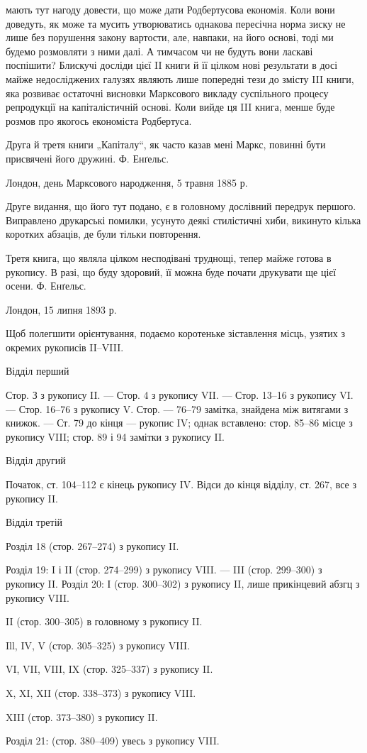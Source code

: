 \parcont{}  %
мають тут нагоду довести, що може дати Родбертусова економія. Коли
вони доведуть, як може та мусить утворюватись однакова пересічна
норма зиску не лише без порушення закону вартости, але, навпаки, на
його основі, тоді ми будемо розмовляти з ними далі. А тимчасом чи не
будуть вони ласкаві поспішити? Блискучі досліди цієї II книги й її цілком нові результати в досі
майже недосліджених галузях являють лише
попередні тези до змісту III книги, яка розвиває остаточні висновки Марксового
викладу суспільного процесу репродукції на капіталістичній
основі. Коли вийде ця III книга, менше буде розмов про якогось економіста
Родбертуса.

Друга й третя книги „Капіталу“, як часто казав мені Маркс, повинні
бути присвячені його дружині.
Ф. Енґельс.

Лондон, день Марксового народження, 5 травня 1885 р.

Друге видання, що його тут подано, є в головному дослівний передрук
першого. Виправлено друкарські помилки, усунуто деякі стилістичні
хиби, викинуто кілька коротких абзаців, де були тільки повторення.

Третя книга, що являла цілком несподівані труднощі, тепер майже
готова в рукопису. В разі, що буду здоровий, її можна буде почати
друкувати ще цієї осени. Ф. Енґельс.

Лондон, 15 липня 1893 р.

Щоб полегшити орієнтування, подаємо коротеньке зіставлення місць,
узятих з окремих рукописів II--VIII.

Відділ перший

Стор. З з рукопису II. — Стор. 4 з рукопису VII. — Стор. 13--16
з рукопису VI. — Стор. 16--76 з рукопису V. Стор. — 76--79 замітка, знайдена
між витягами з книжок. — Ст. 79 до кінця — рукопис IV; однак
вставлено: стор. 85--86 місце з рукопису VIII; стор. 89 і 94 замітки з
рукопису II.

Відділ другий

Початок, ст. 104--112 є кінець рукопису IV. Відси до кінця відділу,
ст. 267, все з рукопису II.

Відділ третій

Розділ 18 (стор. 267--274) з рукопису II.

Розділ 19: I і II (стор. 274--299) з рукопису VIII. — III (стор. 299--300)
з рукопису II.
Розділ 20: І (стор. 300--302) з рукопису II, лише прикінцевий
абзгц з рукопису VIII.

II (стор. 300--305) в головному з рукопису II.

Ill, IV, V (стор. 305--325) з рукопису VIII.

VI, VII, VIII, IX (стор. 325--337) з рукопису II.

X, XI, XII (стор. 338--373) з рукопису VIII.

XIII (стор. 373--380) з рукопису II.

Розділ 21: (стор. 380--409) увесь з рукопису VIII.
\parbreak{}  %

